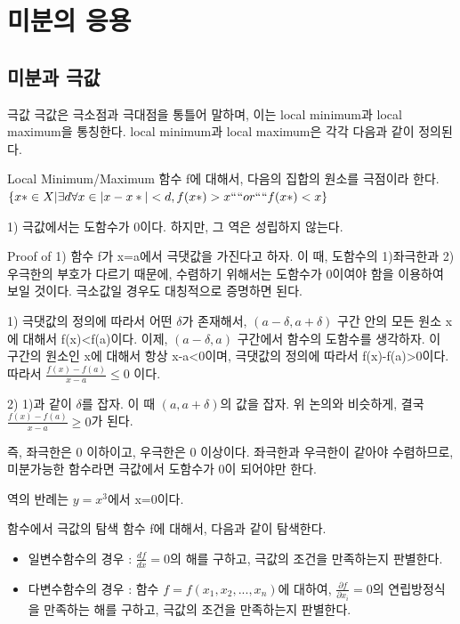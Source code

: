 \documentclass{beamer}
\begin{document}
\section{미분의 응용}

\subsection{미분과 극값} 

\begin{frame}{극값}
극값은 극소점과 극대점을 통틀어 말하며, 이는 local minimum과 local maximum을 통칭한다. local minimum과 local maximum은 각각 다음과 같이 정의된다. 

\begin{block}{Local Minimum/Maximum }
함수 f에 대해서, 다음의 집합의 원소를 극점이라 한다. 
$\{x* \in X| \exists d \forall x \in |x-x*|<d, f(x*) > x ````or ````f(x*) < x\}$
\end{block}

1) 극값에서는 도함수가 0이다. 하지만, 그 역은 성립하지 않는다. 

\end{frame} 

\begin{frame}{Proof of 1)}
함수 f가 x=a에서 극댓값을 가진다고 하자. 이 때, 도함수의 1)좌극한과 2)우극한의 부호가 다르기 때문에, 수렴하기 위해서는 도함수가 0이여야 함을 이용하여 보일 것이다. 극소값일 경우도 대칭적으로 증명하면 된다. 

1) 극댓값의 정의에 따라서 어떤 $\delta$가 존재해서, $(a-\delta, a+\delta)$ 구간 안의 모든 원소 x에 대해서 f(x)<f(a)이다. 이제, $(a-\delta, a)$ 구간에서 함수의 도함수를 생각하자. 이 구간의 원소인 x에 대해서 항상 x-a<0이며, 극댓값의 정의에 따라서 f(x)-f(a)>0이다. 따라서 $\frac{f(x)-f(a)}{x-a}\leq 0$ 이다. 

2) 1)과 같이 $\delta$를 잡자. 이 때 $(a, a+\delta)$의 값을 잡자. 위 논의와 비슷하게, 결국 $\frac{f(x)-f(a)}{x-a}\geq 0$가 된다. 

즉, 좌극한은 0 이하이고, 우극한은 0 이상이다. 좌극한과 우극한이 같아야 수렴하므로, 미분가능한 함수라면 극값에서 도함수가 0이 되어야만 한다. 

역의 반례는 $y=x^3$에서 x=0이다.  
\end{frame} 


\begin{frame}{함수에서 극값의 탐색}
함수 f에 대해서, 다음과 같이 탐색한다. 
\begin{itemize} 
\item 일변수함수의 경우 : $\frac{df}{dx}=0$의 해를 구하고, 극값의 조건을 만족하는지 판별한다. 
\item 다변수함수의 경우 : 함수 $f=f(x_1, x_2, ..., x_n)$에 대하여, $\frac{\partial f}{\partial x_i}=0$의 연립방정식을 만족하는 해를 구하고, 극값의 조건을 만족하는지 판별한다. 
\end{itemize}
\end{frame}
\end{document}
